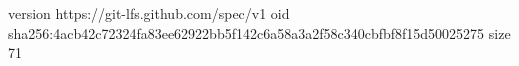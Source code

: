 version https://git-lfs.github.com/spec/v1
oid sha256:4acb42c72324fa83ee62922bb5f142c6a58a3a2f58c340cbfbf8f15d50025275
size 71
